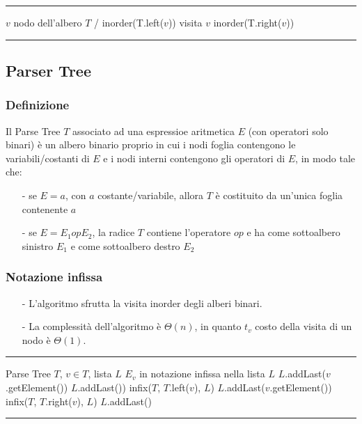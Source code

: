 \documentclass[a4paper]{article}
\makeatletter
\newenvironment{algo}[4]{
	\noindent\rule{\textwidth}{0.4pt}
	\begin{algorithmic}[1]
		\addtocounter{ALG@line}{-1}
		\Procedure{#1}{#2}
		\Require #3
		\Ensure #4
		\Statex }{
		\EndProcedure
	\end{algorithmic}
	\rule{\textwidth}{0.4pt}}
\makeatother
\begin{document}
\begin{algo}{inorder}{$v$}{$v$ nodo dell'albero $T$}{/}
		\State inorder(T.left(\(v\)))
	\EndIf
	\State visita $v$
		\State inorder(T.right(\(v\)))
	\EndIf
\end{algo}

\subsection{Parser Tree}
\subsubsection*{Definizione}
Il Parse Tree \(T\) associato ad una espressioe aritmetica \(E\) (con operatori solo binari) è un albero binario proprio in cui
i nodi foglia contengono le variabili/costanti di \(E\) e i nodi interni contengono gli operatori di \(E\), in modo tale che:
\begin{itemize}[topsep=3pt, itemsep=0pt]
	\item[-] se \(E = a\), con \(a\) costante/variabile, allora \(T\) è costituito da un'unica foglia contenente \(a\)
	\item[-] se \(E = E_1 op E_2\), la radice \(T\) contiene l'operatore \(op\) e ha come sottoalbero sinistro \(E_1\) e come
	sottoalbero destro \(E_2\)
\end{itemize}

\subsubsection*{Notazione infissa}
\begin{itemize}[topsep=3pt, itemsep=0pt]
	\item[-] L'algoritmo sfrutta la visita inorder degli alberi binari.
	\item[-] La complessità dell'algoritmo è \(\Theta\left(n\right)\), in quanto \(t_v\) costo della visita di un nodo è \(\Theta(1)\).
\end{itemize}
\begin{algo}{infix}{$T$, $v$, $L$}{Parse Tree $T$, \(v \in T\), lista $L$}{$E_v$ in notazione infissa nella lista $L$}
		\State $L$.addLast($v$.getElement())
	\Else
		\State $L$.addLast(\say{(}))
		\State infix($T$, $T$.left($v$), $L$)
		\State $L$.addLast($v$.getElement())
		\State infix($T$, $T$.right($v$), $L$)
		\State $L$.addLast(\say{)})
	\EndIf
\end{algo}
\end{document}
